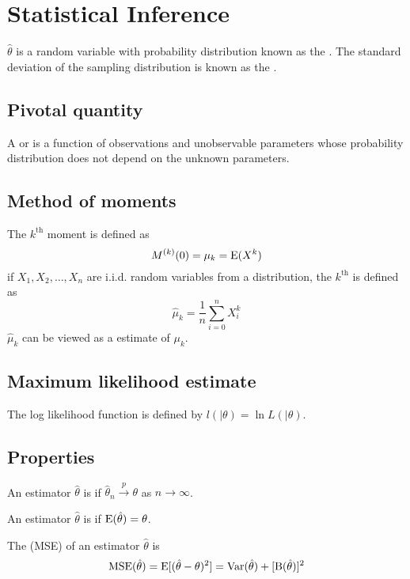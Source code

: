 \section{Statistical Inference}

$\hat\theta$ is a random variable with probability distribution
	known as the .
The standard deviation of the sampling distribution
	is known as the .

\subsection{Pivotal quantity}\label{concept:pivot}
	A  or  is a function of observations and unobservable parameters whose probability distribution does not depend on the unknown parameters.

\subsection{Method of moments}
The $k^\mathrm{th}$ moment is defined as
\[M^{(k)}(0)=\mu_k=\mathrm{E}(X^k)\]
if $X_1, X_2, \ldots, X_n$ are i.i.d. random variables from a distribution,
the $k^\mathrm{th}$  is defined as
\[\hat\mu_k=\frac{1}{n}\sum_{i=0}^n X_i^k\]
$\hat\mu_k$ can be viewed as a  estimate of $\mu_k$.



\subsection{Maximum likelihood estimate}


The log likelihood function is defined by $l(|\theta)=\ln L(|\theta)$.

\subsection{Properties}

An estimator $\hat\theta$ is  if $\hat{\theta}_n \xrightarrow{p} \theta$
as $n\to\infty$.

An estimator $\hat\theta$ is  if $\mathrm{E}(\hat\theta)=\theta$.

The (MSE) of an estimator $\hat{\theta}$ is
\[\mathrm{MSE}(\hat{\theta})=\mathrm{E}[(\hat{\theta}-\theta)^2]=\mathrm{Var}(\hat{\theta})+ [\mathrm{B}(\hat{\theta})]^2\]

